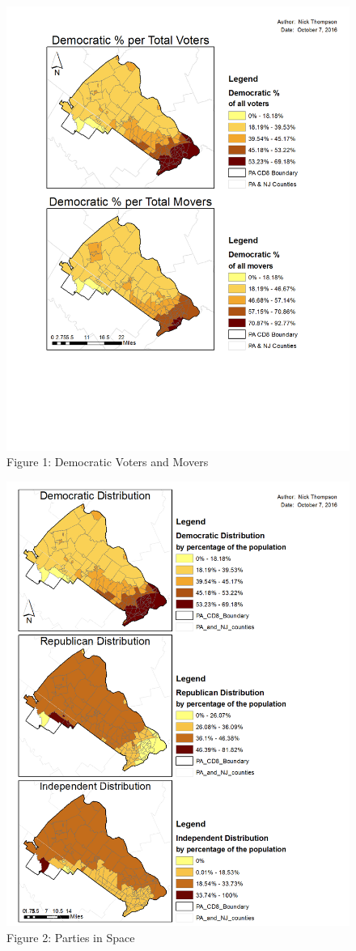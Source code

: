 \documentclass[]{article}
\begin{document}
\begin{figure}[htbp]
\centering
\includegraphics{question_1-2.png}
\caption{Figure 1: Democratic Voters and Movers}
\end{figure}

\begin{figure}[htbp]
\centering
\includegraphics{question_2.png}
\caption{Figure 2: Parties in Space}
\end{figure}
\end{document}
